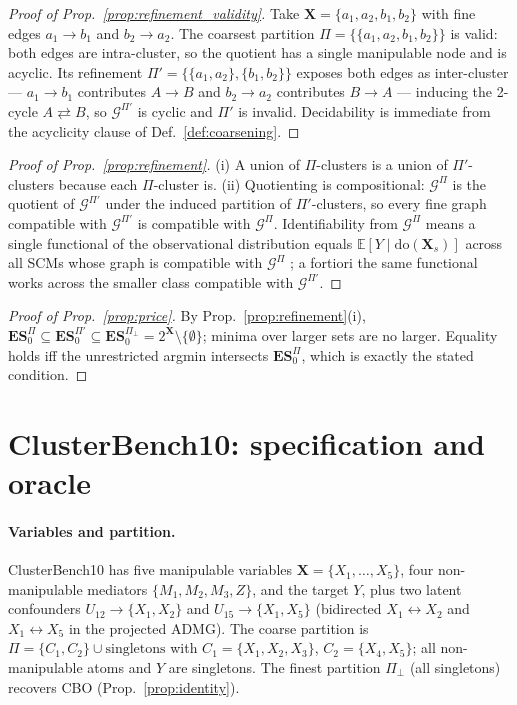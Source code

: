 \documentclass[twoside]{article}
\newcommand{\E}{\mathbb{E}}
\newcommand{\doo}{\mathrm{do}}
\newcommand{\CBO}{\textsc{CBO}}
\newcommand{\Gq}{\mathcal{G}^{\Pi}}
\newcommand{\ES}{\mathbf{ES}}
\newcommand{\ESpi}{\mathbf{ES}^{\Pi}}
\begin{document}
\begin{proof}[Proof of Prop.~\ref{prop:refinement_validity}]
Take $\mathbf{X}=\{a_1,a_2,b_1,b_2\}$ with fine edges $a_1\to b_1$ and $b_2\to a_2$.
The coarsest partition $\Pi=\{\{a_1,a_2,b_1,b_2\}\}$ is valid: both edges are
intra-cluster, so the quotient has a single manipulable node and is acyclic. Its
refinement $\Pi'=\{\{a_1,a_2\},\{b_1,b_2\}\}$ exposes both edges as inter-cluster ---
$a_1\to b_1$ contributes $A\to B$ and $b_2\to a_2$ contributes $B\to A$ --- inducing
the 2-cycle $A\rightleftarrows B$, so $\mathcal{G}^{\Pi'}$ is cyclic and $\Pi'$ is
invalid. Decidability is immediate from the acyclicity clause of
Def.~\ref{def:coarsening}.
\end{proof}

\begin{proof}[Proof of Prop.~\ref{prop:refinement}]
(i) A union of $\Pi$-clusters is a union of $\Pi'$-clusters because each
$\Pi$-cluster is. (ii) Quotienting is compositional: $\Gq$ is the quotient of
$\mathcal{G}^{\Pi'}$ under the induced partition of $\Pi'$-clusters, so every fine
graph compatible with $\mathcal{G}^{\Pi'}$ is compatible with $\Gq$. Identifiability
from $\Gq$ means a single functional of the observational distribution equals
$\E[Y\mid\doo(\mathbf{X}_s)]$ across all SCMs whose graph is compatible with $\Gq$
\citep{anand2023cdag}; a fortiori the same functional works across the smaller class
compatible with $\mathcal{G}^{\Pi'}$.
\end{proof}

\begin{proof}[Proof of Prop.~\ref{prop:price}]
By Prop.~\ref{prop:refinement}(i), $\ESpi_0\subseteq\ES^{\Pi'}_0\subseteq
\ES^{\Pi_\bot}_0=2^{\mathbf{X}}\setminus\{\emptyset\}$; minima over larger
sets are no larger. Equality holds iff the unrestricted argmin intersects $\ESpi_0$,
which is exactly the stated condition.
\end{proof}

\section{ClusterBench10: specification and oracle}\label{app:scm}

\paragraph{Variables and partition.}
ClusterBench10 has five manipulable variables $\mathbf{X}=\{X_1,\dots,X_5\}$, four
non-manipulable mediators $\{M_1,M_2,M_3,Z\}$, and the target $Y$, plus two latent
confounders $U_{12}\!\to\!\{X_1,X_2\}$ and $U_{15}\!\to\!\{X_1,X_5\}$ (bidirected
$X_1\!\leftrightarrow\!X_2$ and $X_1\!\leftrightarrow\!X_5$ in the projected ADMG).
The coarse partition is $\Pi=\{C_1,C_2\}\cup\text{singletons}$ with
$C_1=\{X_1,X_2,X_3\}$, $C_2=\{X_4,X_5\}$; all non-manipulable atoms and $Y$ are
singletons. The finest partition $\Pi_\bot$ (all singletons) recovers \CBO{}
(Prop.~\ref{prop:identity}).
\end{document}
